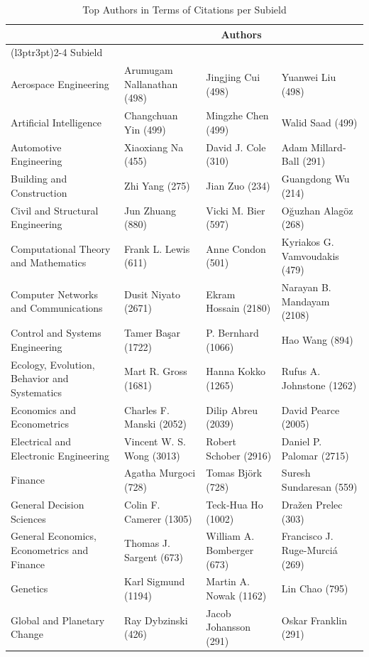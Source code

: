 \documentclass[
  12pt,
]{article}
\begin{document}
\begin{table}[H]

\caption{\label{tab:authors per subfield}Top Authors in Terms of Citations per Subield}
\centering
\fontsize{8}{10}\selectfont
\begin{tabular}[t]{llll}
\toprule
\multicolumn{1}{c}{ } & \multicolumn{3}{c}{Authors} \\
\cmidrule(l{3pt}r{3pt}){2-4}
Subield &  &  & \\
\midrule
Aerospace Engineering & Arumugam Nallanathan (498) & Jingjing Cui (498) & Yuanwei Liu (498)\\
Artificial Intelligence & Changchuan Yin (499) & Mingzhe Chen (499) & Walid Saad (499)\\
Automotive Engineering & Xiaoxiang Na (455) & David J. Cole (310) & Adam Millard‐Ball (291)\\
Building and Construction & Zhi Yang (275) & Jian Zuo (234) & Guangdong Wu (214)\\
Civil and Structural Engineering & Jun Zhuang (880) & Vicki M. Bier (597) & Oğuzhan Alagöz (268)\\
Computational Theory and Mathematics & Frank L. Lewis (611) & Anne Condon (501) & Kyriakos G. Vamvoudakis (479)\\
Computer Networks and Communications & Dusit Niyato (2671) & Ekram Hossain (2180) & Narayan B. Mandayam (2108)\\
Control and Systems Engineering & Tamer Başar (1722) & P. Bernhard (1066) & Hao Wang (894)\\
Ecology, Evolution, Behavior and Systematics & Mart R. Gross (1681) & Hanna Kokko (1265) & Rufus A. Johnstone (1262)\\
Economics and Econometrics & Charles F. Manski (2052) & Dilip Abreu (2039) & David Pearce (2005)\\
Electrical and Electronic Engineering & Vincent W. S. Wong (3013) & Robert Schober (2916) & Daniel P. Palomar (2715)\\
Finance & Agatha Murgoci (728) & Tomas Björk (728) & Suresh Sundaresan (559)\\
General Decision Sciences & Colin F. Camerer (1305) & Teck‐Hua Ho (1002) & Dražen Prelec (303)\\
General Economics, Econometrics and Finance & Thomas J. Sargent (673) & William A. Bomberger (673) & Francisco J. Ruge-Murciá (269)\\
Genetics & Karl Sigmund (1194) & Martin A. Nowak (1162) & Lin Chao (795)\\
Global and Planetary Change & Ray Dybzinski (426) & Jacob Johansson (291) & Oskar Franklin (291)\\

\end{tabular}
\end{table}
\end{document}
